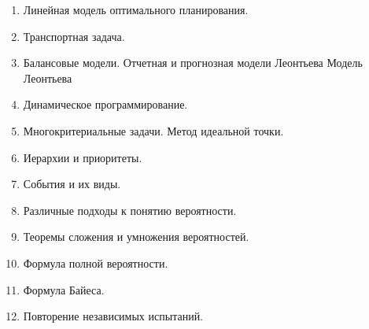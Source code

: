 \documentclass[a4paper,12pt]{extarticle}
\begin{document}
\begin{enumerate}
    \item 
        Линейная модель оптимального планирования.
    \item 
         Транспортная задача.
    \item 
         Балансовые модели. Отчетная и прогнозная модели Леонтьева
         Модель Леонтьева
    \item 
        Динамическое программирование. 
    \item 
        Многокритериальные задачи. Метод идеальной точки.
    \item 
        Иерархии и приоритеты. 
    \item 
        События и их виды.
    \item 
        Различные подходы к понятию вероятности.
    \item 
        Теоремы сложения и умножения вероятностей.
    \item 
        Формула полной вероятности.
    \item 
        Формула Байеса.
    \item 
        Повторение независимых испытаний.

\end{enumerate}
\end{document}
